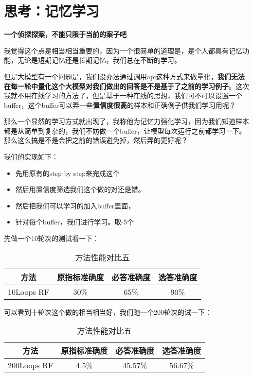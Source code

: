 \documentclass[answers]{exam}  %
\begin{document}
\section{思考：记忆学习}

\textbf{一个侦探探案，不能只限于当前的案子吧}

\medskip

我觉得这个点是相当相当重要的，因为一个很简单的道理是，是个人都具有记忆功能，无论是短期记忆还是长期记忆，我们总在不断的学习。

但是大模型有一个问题是，我们没办法通过调用api这种方式来做量化，\textbf{我们无法在每一轮中量化这个大模型对我们做出的回答是不是基于了之前的学习例子}。这次我就不用在线学习的方法了，但是基于一种在线的思想，我们可不可以设置一个buffer，这个buffer可以弄一些\textbf{置信度很高}的样本和正确例子供我们学习用呢？

那么一个显然的学习方式就出现了，我称他为记忆力强化学习，因为我们知道样本都是从简单到复杂的，我们不妨做一个buffer，让模型每次运行之前都学习一下。那么这么搞是不是会把之前的错误避免掉，然后弄的更好呢？

我们的实现如下：
\begin{itemize}
    \item 先用原有的step by step来完成这个
    \item 然后用置信度筛选我们这个做的对还是错。
    \item 然后把我们可以学习的加入buffer里面，
    \item 针对每个buffer，我们进行学习。取-5个
\end{itemize}

先做一个10轮次的测试看一下：

\begin{table}[h]
    \centering
    \begin{tabular}{cccc}
    \toprule
    \textbf{方法} & \textbf{原指标准确度} & \textbf{必答准确度} &\textbf{选答准确度}\\
    \midrule
    10Loops RF & 30\% & 65\% & 90\% \\
    \bottomrule
    \end{tabular}
    \caption{方法性能对比五}
\end{table}

可以看到十轮次这个做的相当相当好，我们跑一个200轮次的试一下：

\begin{table}[h]
    \centering
    \begin{tabular}{cccc}
    \toprule
    \textbf{方法} & \textbf{原指标准确度} & \textbf{必答准确度} &\textbf{选答准确度}\\
    \midrule
    200Loops RF & 4.5\% & 45.57\% & 56.67\% \\
    \bottomrule
    \end{tabular}
    \caption{方法性能对比五}
\end{table}
\end{document}
